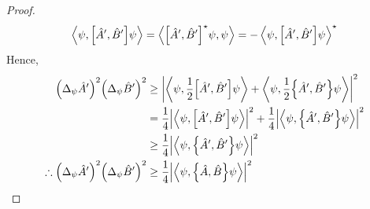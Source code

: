 \begin{proof}
	\[
		\left\langle{\psi, \qty[\hat A', \hat B'] \psi}\right\rangle = \left\langle{\qty[\hat A', \hat B']^\star \psi, \psi}\right\rangle = -\left\langle{\psi, \qty[\hat A', \hat B'] \psi}\right\rangle^\star
	\]
	Hence,
	\begin{align*}
		\qty(\Delta_\psi \hat A')^2 \qty(\Delta_\psi \hat B')^2            & \geq \abs{\left\langle{\psi, \frac{1}{2} \qty[\hat A', \hat B'] \psi}\right\rangle + \left\langle{\psi, \frac{1}{2} \qty{\hat A', \hat B'} \psi}\right\rangle}^2     \\
		                                                                   & = \frac{1}{4} \abs{\left\langle{\psi, \qty[\hat A', \hat B'] \psi}\right\rangle}^2 + \frac{1}{4} \abs{\left\langle{\psi, \qty{\hat A', \hat B'}\psi}\right\rangle}^2 \\
		                                                                   & \geq \frac{1}{4} \abs{\left\langle{\psi, \qty{\hat A', \hat B'} \psi}\right\rangle}^2                                                             \\
		\therefore \qty(\Delta_\psi \hat A')^2 \qty(\Delta_\psi \hat B')^2 & \geq \frac{1}{4} \abs{\left\langle{\psi, \qty{\hat A, \hat B} \psi}\right\rangle}^2
	\end{align*}
\end{proof}
